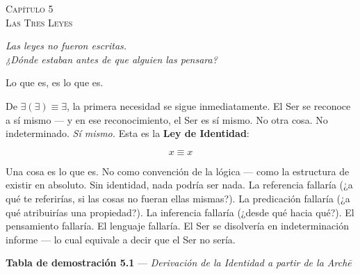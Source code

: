 \documentclass[10pt, openany, oneside]{book}
\renewcommand{\large}{\fontsize{11.5}{14}\selectfont}
\renewcommand{\huge}{\fontsize{17}{21}\selectfont}
\begin{document}
%
%
%
%

\newpage

\begin{center}
    {\huge\scshape Capítulo 5}\\[0.3em]
    {\large\scshape Las Tres Leyes}
\end{center}

\vspace{1.5em}

\begin{center}
    \itshape
    Las leyes no fueron escritas.\\
    ¿Dónde estaban antes de que alguien las pensara?
\end{center}

\vspace{2em}


\noindent Lo que es, es lo que es.

De $\exists(\exists) \equiv \exists$, la primera necesidad se sigue inmediatamente. El Ser se reconoce a sí mismo --- y en ese reconocimiento, el Ser es sí mismo. No otra cosa. No indeterminado. \textit{Sí mismo.} Esta es la \textbf{Ley de Identidad}:

$$x \equiv x$$

Una cosa es lo que es. No como convención de la lógica --- como la estructura de existir en absoluto. Sin identidad, nada podría ser nada. La referencia fallaría (¿a qué te referirías, si las cosas no fueran ellas mismas?). La predicación fallaría (¿a qué atribuirías una propiedad?). La inferencia fallaría (¿desde qué hacia qué?). El pensamiento fallaría. El lenguaje fallaría. El Ser se disolvería en indeterminación informe --- lo cual equivale a decir que el Ser no sería.

\vspace{0.5em}

\textbf{Tabla de demostración 5.1} --- \textit{Derivación de la Identidad a partir de la Arch\={e}}
\end{document}

